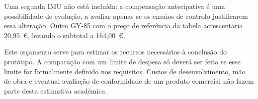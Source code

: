 Uma segunda IMU não está incluída: a compensação antecipativa é uma possibilidade de evolução, a avaliar apenas se os ensaios de controlo justificarem essa alteração. Outro GY-85 com o preço de referência da tabela acrescentaria 20,95~€, levando o subtotal a 164,00~€.

Este orçamento serve para estimar os recursos necessários à conclusão do protótipo. A comparação com um limite de despesa só deverá ser feita se esse limite for formalmente definido nos requisitos. Custos de desenvolvimento, mão de obra e eventual avaliação de conformidade de um produto comercial não fazem parte desta estimativa académica.
